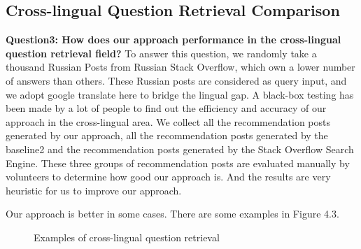 	\subsection{Cross-lingual Question Retrieval Comparison}
	{\bf Question3: How does our approach performance in the cross-lingual question retrieval field?}
To answer this question, we randomly take a thousand Russian Posts from Russian Stack Overflow, which own a lower number of answers than others. These Russian posts are considered as query input, and we adopt google translate here to bridge the lingual gap. A black-box testing has been made by a lot of people to find out the efficiency and accuracy of our approach in the cross-lingual area. We collect all the recommendation posts generated by our approach, all the recommendation posts generated by the baseline2 and the recommendation posts generated by the Stack Overflow Search Engine. These three groups of recommendation posts are evaluated manually by volunteers to determine how good our approach is. And the results are very heuristic for us to improve our approach. 
\par
Our approach is better in some cases. There are some examples in Figure 4.3.
\begin{figure}[!h]
	\centering
	\caption{Examples of cross-lingual question retrieval}
	\label{fig}
\end{figure}
	
	